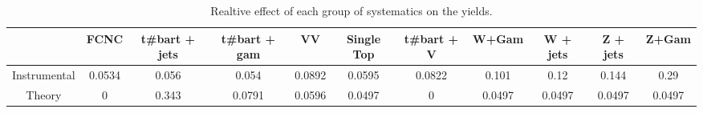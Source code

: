 \begin{table}[htbp]
\begin{center}
\begin{tabular}{|c|c|c|c|c|c|c|c|c|c|c|}
\hline 
      & FCNC      & t#bar{t} + jets      & t#bar{t} +  gam      & VV      & Single Top      & t#bar{t} + V      & W+Gam      & W + jets      & Z + jets      & Z+Gam \\ 
\hline 
 Instrumental & 0.0534 & 0.056 & 0.054 & 0.0892 & 0.0595 & 0.0822 & 0.101 & 0.12 & 0.144 & 0.29 \\ 
 Theory & 0 & 0.343 & 0.0791 & 0.0596 & 0.0497 & 0 & 0.0497 & 0.0497 & 0.0497 & 0.0497 \\ 
\hline 
\end{tabular} 
\caption{Realtive effect of each group of systematics on the yields.} 
\end{center} 
\end{table} 
